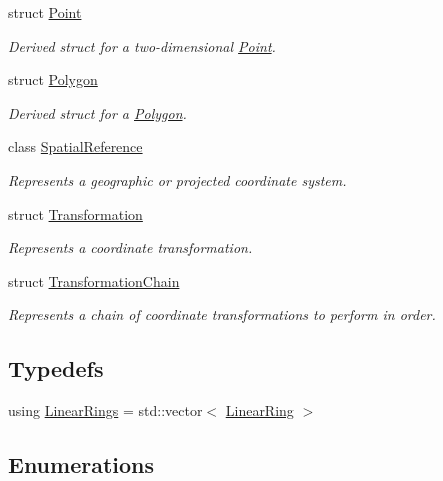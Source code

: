 \begin{DoxyCompactItemize}
struct \hyperlink{structdg_1_1deepcore_1_1geometry_1_1_point}{Point}
\begin{DoxyCompactList}\small\item\em Derived struct for a two-\/dimensional \hyperlink{structdg_1_1deepcore_1_1geometry_1_1_point}{Point}. \end{DoxyCompactList}\item 
struct \hyperlink{structdg_1_1deepcore_1_1geometry_1_1_polygon}{Polygon}
\begin{DoxyCompactList}\small\item\em Derived struct for a \hyperlink{structdg_1_1deepcore_1_1geometry_1_1_polygon}{Polygon}. \end{DoxyCompactList}\item 
class \hyperlink{classdg_1_1deepcore_1_1geometry_1_1_spatial_reference}{Spatial\+Reference}
\begin{DoxyCompactList}\small\item\em Represents a geographic or projected coordinate system. \end{DoxyCompactList}\item 
struct \hyperlink{structdg_1_1deepcore_1_1geometry_1_1_transformation}{Transformation}
\begin{DoxyCompactList}\small\item\em Represents a coordinate transformation. \end{DoxyCompactList}\item 
struct \hyperlink{structdg_1_1deepcore_1_1geometry_1_1_transformation_chain}{Transformation\+Chain}
\begin{DoxyCompactList}\small\item\em Represents a chain of coordinate transformations to perform in order. \end{DoxyCompactList}\end{DoxyCompactItemize}
\subsection*{Typedefs}
\begin{DoxyCompactItemize}
\item 
using \hyperlink{namespacedg_1_1deepcore_1_1geometry_a30a8b05e06c4718edc95c06f0958576d}{Linear\+Rings} = std\+::vector$<$ \hyperlink{structdg_1_1deepcore_1_1geometry_1_1_linear_ring}{Linear\+Ring} $>$
\end{DoxyCompactItemize}
\subsection*{Enumerations}
